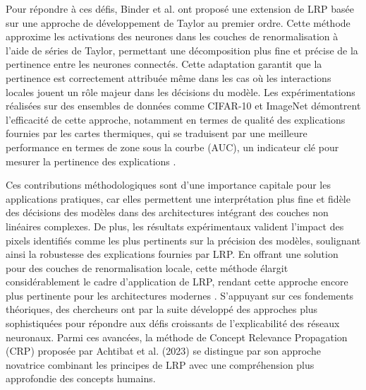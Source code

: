 \documentclass[runningheads]{llncs}
\begin{document}
Pour répondre à ces défis, Binder et al. ont proposé une extension de LRP basée sur une approche de développement de Taylor au premier ordre. Cette méthode approxime les activations des neurones dans les couches de renormalisation à l'aide de séries de Taylor, permettant une décomposition plus fine et précise de la pertinence entre les neurones connectés. Cette adaptation garantit que la pertinence est correctement attribuée même dans les cas où les interactions locales jouent un rôle majeur dans les décisions du modèle. Les expérimentations réalisées sur des ensembles de données comme CIFAR-10 et ImageNet démontrent l'efficacité de cette approche, notamment en termes de qualité des explications fournies par les cartes thermiques, qui se traduisent par une meilleure performance en termes de zone sous la courbe (AUC), un indicateur clé pour mesurer la pertinence des explications \autocite{binder2016layerwiserelevancepropagationneural}.

Ces contributions méthodologiques sont d'une importance capitale pour les applications pratiques, car elles permettent une interprétation plus fine et fidèle des décisions des modèles dans des architectures intégrant des couches non linéaires complexes. De plus, les résultats expérimentaux valident l'impact des pixels identifiés comme les plus pertinents sur la précision des modèles, soulignant ainsi la robustesse des explications fournies par LRP. En offrant une solution pour des couches de renormalisation locale, cette méthode élargit considérablement le cadre d'application de LRP, rendant cette approche encore plus pertinente pour les architectures modernes \autocite{binder2016layerwiserelevancepropagationneural}. S'appuyant sur ces fondements théoriques, des chercheurs ont par la suite développé des approches plus sophistiquées pour répondre aux défis croissants de l'explicabilité des réseaux neuronaux. Parmi ces avancées, la méthode de Concept Relevance Propagation (CRP) proposée par Achtibat et al. (2023) \autocite{Achtibat2023} se distingue par son approche novatrice combinant les principes de LRP avec une compréhension plus approfondie des concepts humains.
\bigskip
\end{document}
